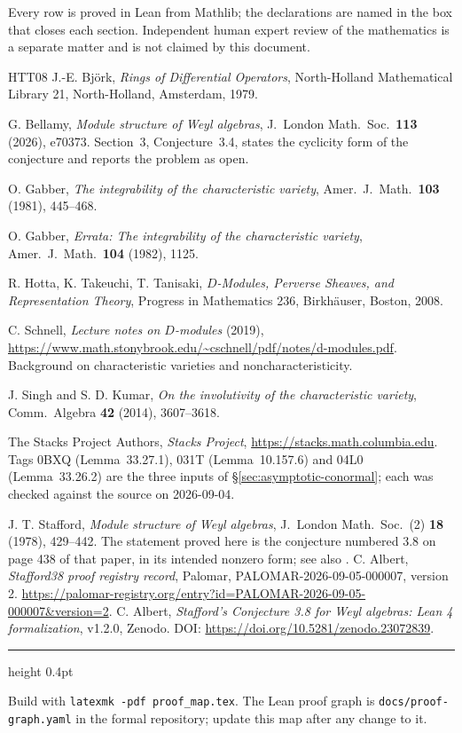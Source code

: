 \documentclass[11pt]{article}
\theoremstyle{plain}
\theoremstyle{definition}
\theoremstyle{remark}
\theoremstyle{plain}
\begin{document}
\vspace{2ex}
\noindent Every row is proved in Lean from Mathlib; the declarations are named
in the box that closes each section. Independent human expert review of the
mathematics is a separate matter and is not claimed by this document.

\begin{thebibliography}{HTT08}
J.-E. Bj\"ork, \emph{Rings of Differential Operators}, North-Holland
Mathematical Library 21, North-Holland, Amsterdam, 1979.

G. Bellamy, \emph{Module structure of Weyl algebras}, J.~London Math.\ Soc.\
\textbf{113} (2026), e70373. Section~3, Conjecture~3.4, states the cyclicity
form of the conjecture and reports the problem as open.

O. Gabber, \emph{The integrability of the characteristic variety},
Amer.\ J.\ Math.\ \textbf{103} (1981), 445--468.

O. Gabber, \emph{Errata: The integrability of the characteristic variety},
Amer.\ J.\ Math.\ \textbf{104} (1982), 1125.

R. Hotta, K. Takeuchi, T. Tanisaki, \emph{$D$-Modules, Perverse Sheaves, and
Representation Theory}, Progress in Mathematics 236, Birkh\"auser, Boston,
2008.

C. Schnell, \emph{Lecture notes on $D$-modules} (2019),
\url{https://www.math.stonybrook.edu/~cschnell/pdf/notes/d-modules.pdf}.
Background on characteristic varieties and noncharacteristicity.

J. Singh and S. D. Kumar, \emph{On the involutivity of the characteristic
variety}, Comm.\ Algebra \textbf{42} (2014), 3607--3618.

The Stacks Project Authors, \emph{Stacks Project},
\url{https://stacks.math.columbia.edu}. Tags 0BXQ (Lemma~33.27.1), 031T
(Lemma~10.157.6) and 04L0 (Lemma~33.26.2) are the three inputs of
\S\ref{sec:asymptotic-conormal}; each was checked against the source on
2026-09-04.

J. T. Stafford, \emph{Module structure of Weyl algebras}, J.~London Math.\ Soc.\
(2) \textbf{18} (1978), 429--442. The statement proved here is the conjecture
numbered 3.8 on page 438 of that paper, in its intended nonzero form; see also
\cite{Bellamy}.
\bibitem{Stafford38Palomar2026}
C. Albert, \emph{Stafford38 proof registry record}, Palomar,
PALOMAR-2026-09-05-000007, version 2.
\url{https://palomar-registry.org/entry?id=PALOMAR-2026-09-05-000007&version=2}.
\bibitem{Stafford38Zenodo120}
C. Albert, \emph{Stafford's Conjecture 3.8 for Weyl algebras: Lean 4 formalization},
v1.2.0, Zenodo. DOI: \url{https://doi.org/10.5281/zenodo.23072839}.
\end{thebibliography}

\vspace{1ex}
\hrule height 0.4pt
\vspace{0.8ex}
{\footnotesize\raggedright
Build with \texttt{latexmk -pdf proof\_map.tex}. The Lean proof graph is
\texttt{docs/proof-graph.yaml} in the formal repository; update this map after
any change to it.
\par}
\end{document}
